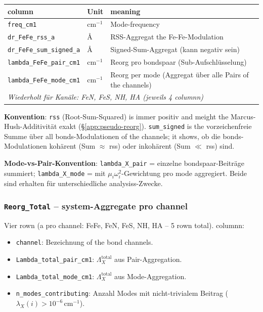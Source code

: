 \documentclass[11pt,a4paper,twoside]{article}
\providecommand{\angstrom}{\text{\AA}}    %
\theoremstyle{remark}
\begin{document}
\begin{center}
\small
\begin{tabular}{p{4.0cm}p{1.4cm}p{7.6cm}}
\toprule
\textbf{column} & \textbf{Unit} & \textbf{meaning} \\
\midrule
\texttt{freq\_cm1}                  & cm$^{-1}$ & Mode-frequency \\
\texttt{dr\_FeFe\_rss\_a}           & $\angstrom$ & RSS-Aggregat
                                                    the Fe-Fe-Modulation \\
\texttt{dr\_FeFe\_sum\_signed\_a}   & $\angstrom$ & Signed-Sum-Aggregat
                                                    (kann negativ sein) \\
\texttt{lambda\_FeFe\_pair\_cm1}    & cm$^{-1}$ & Reorg pro bondspaar
                                                  (Sub-Aufschl\"usselung) \\
\texttt{lambda\_FeFe\_mode\_cm1}    & cm$^{-1}$ & Reorg per mode
                                                  (Aggregat \"uber alle
                                                  Pairs of the channels) \\
\midrule
\multicolumn{3}{l}{\textit{Wiederholt f\"ur Kan\"ale: FeN, FeS, NH, HA
       (jeweils 4 columnn)}} \\
\bottomrule
\end{tabular}
\end{center}

\textbf{Konvention}: \texttt{rss} (Root-Sum-Squared) is immer
positiv and meight the Marcus-Hush-Additivit\"at exakt
(\S\ref{app:pseudo-reorg}). \texttt{sum\_signed} is the vorzeichenfreie
Summe \"uber all bonds-Modulationen of the channels; it shows, ob
die bonds-Modulationen koh\"arent (Sum $\approx$ rss) oder
inkoh\"arent (Sum $\ll$ rss) sind.

\textbf{Mode-vs-Pair-Konvention}: \texttt{lambda\_X\_pair} = einzelne
bondspaar-Beitr\"age summiert; \texttt{lambda\_X\_mode} = mit
$\mu_i\omega_i^2$-Gewichtung pro mode aggregiert. Beide sind
erhalten f\"ur unterschiedliche analysiss-Zwecke.

\subsubsection*{\texttt{Reorg\_Total} -- system-Aggregate pro channel}

Vier rown (a pro channel: FeFe, FeN, FeS, NH, HA -- 5 rown
total). columnn:

\begin{itemize}\setlength{\itemsep}{0pt}
  \item \texttt{channel}: Bezeichnung of the bond channels.
  \item \texttt{Lambda\_total\_pair\_cm1}: $\Lambda_X^\text{total}$
        aus Pair-Aggregation.
  \item \texttt{Lambda\_total\_mode\_cm1}: $\Lambda_X^\text{total}$
        aus Mode-Aggregation.
  \item \texttt{n\_modes\_contributing}: Anzahl Modes mit
        nicht-trivialem Beitrag ($\lambda_X(i) > 10^{-6}$\,cm$^{-1}$).
\end{itemize}
\end{document}
